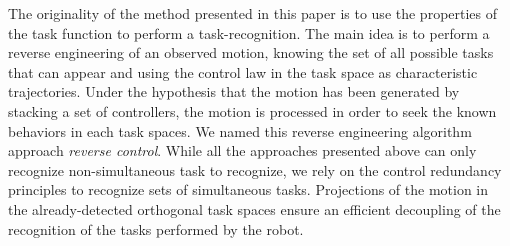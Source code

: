 \documentclass[letterpaper, 10pt, conference]{ieeeconf}      %
\begin{document}
The originality of the method presented in this paper is to use the properties of the
task function to perform a task-recognition. The main idea is
to perform a reverse engineering of an observed motion, knowing the set of all possible tasks that can appear 
and using the control law in the task space as characteristic trajectories. 
Under the hypothesis that the motion has been generated by stacking a set of controllers,
the motion is processed in order to seek the known behaviors in each task spaces. 
We named this reverse engineering algorithm approach \emph{reverse control}.
While all the approaches presented above can only recognize non-simultaneous task to recognize,
we rely on the control redundancy principles to recognize sets of simultaneous tasks.
Projections of the motion in the already-detected orthogonal task spaces
ensure an efficient decoupling of the recognition of the tasks performed
by the robot.
%
%
\end{document}
